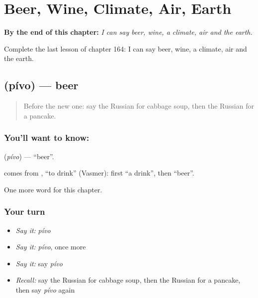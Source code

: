 
\chapter{Beer, Wine, Climate, Air, Earth}
\label{ch:ru-beer-wine-climate-air-earth}

\begin{chapteropening}
\textbf{By the end of this chapter:} \emph{I can say beer, wine, a climate, air and the earth.}

Complete the last lesson of chapter 164: I can say beer, wine, a climate, air and the earth.
\end{chapteropening}

\section[\texorpdfstring{\ru{пиво} (pívo)}{пиво (pívo)}]{ (pívo) — beer}

\label{lesson:RU-C164-pivo}



\begin{quote}
Before the new one: say the Russian for cabbage soup, then the Russian for a pancake.
\end{quote}

\subsection*{You'll want to know: }
\textbf{} (\emph{pívo}) — \textquotedblleft{}beer\textquotedblright{}.

\begin{cousinweb}
\textbf{} comes from \emph{}, \textquotedblleft{}to drink\textquotedblright{} (Vasmer): first \textquotedblleft{}a drink\textquotedblright{}, then \textquotedblleft{}beer\textquotedblright{}.
\end{cousinweb}

\begin{grammarlens}[title={What you've built}]
One more word for this chapter.
\end{grammarlens}

\subsection*{Your turn}
\begin{itemize}
\raggedright
  \item \emph{Say it:} \emph{pívo}
  \item \emph{Say it:} \emph{pívo}, once more
  \item \emph{Say it:} say \emph{pívo}
  \item \emph{Recall:} say the Russian for cabbage soup, then the Russian for a pancake, then say \emph{pívo} again
\end{itemize}

